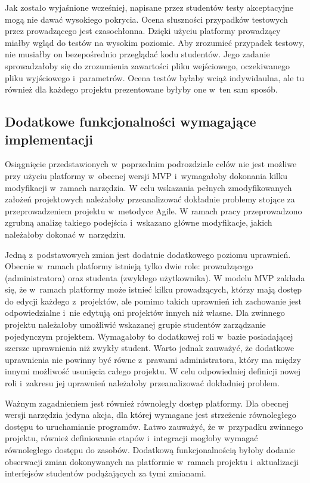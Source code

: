 Jak zostało wyjaśnione wcześniej, napisane przez studentów testy akceptacyjne mogą nie dawać wysokiego pokrycia.
Ocena słuszności przypadków testowych przez prowadzącego jest czasochłonna.
Dzięki użyciu platformy prowadzący miałby wgląd do testów na wysokim poziomie.
Aby zrozumieć przypadek testowy, nie musiałby on bezepośrednio przeglądać kodu studentów.
Jego zadanie sprowadzałoby się do zrozumienia zawartości pliku wejściowego, oczekiwanego pliku wyjściowego i~parametrów.
Ocena testów byłaby wciąż indywidaulna, ale tu również dla każdego projektu prezentowane byłyby one w~ten sam sposób.

\subsection{Dodatkowe funkcjonalności wymagające implementacji}
\label{agile_todo}

Osiągnięcie przedstawionych w~poprzednim podrozdziale celów nie jest możliwe przy użyciu platformy w~obecnej wersji MVP i~wymagałoby dokonania kilku modyfikacji w~ramach narzędzia.
W celu wskazania pełnych zmodyfikowanych założeń projektowych należałoby przeanalizować dokładnie problemy stojące za przeprowadzeniem projektu w~metodyce Agile.
W ramach pracy przeprowadzono zgrubną analizę takiego podejścia i~wskazano główne modyfikacje, jakich należałoby dokonać w~narzędziu.

Jedną z~podstawowych zmian jest dodatnie dodatkowego poziomu uprawnień.
Obecnie w~ramach platformy istnieją tylko dwie role: prowadzącego (administratora) oraz studenta (zwykłego użytkownika).
W modelu MVP zakłada się, że w~ramach platformy może istnieć kilku prowadzących, którzy mają dostęp do edycji każdego z~projektów, ale pomimo takich uprawnień ich zachowanie jest odpowiedzialne i~nie edytują oni projektów innych niż własne.
Dla zwinnego projektu należałoby umożliwić wskazanej grupie studentów zarządzanie pojedynczym projektem.
Wymagałoby to dodatkowej roli w~bazie posiadającej szersze uprawnienia niż zwykły student.
Warto jednak zauważyć, że dodatkowe uprawnienia nie powinny być równe z~prawami administratora, który ma między innymi możliwość usunięcia całego projektu.
W celu odpowiedniej definicji nowej roli i~zakresu jej uprawnień należałoby przeanalizować dokładniej problem.

Ważnym zagadnieniem jest również równoległy dostęp platformy.
Dla obecnej wersji narzędzia jedyna akcja, dla której wymagane jest strzeżenie równoległego dostępu to uruchamianie programów.
Łatwo zauważyć, że w~przypadku zwinnego projektu, również definiowanie etapów i~integracji mogłoby wymagać równoległego dostępu do zasobów.
Dodatkową funkcjonalnością byłoby dodanie obserwacji zmian dokonywanych na platformie w~ramach projektu i~aktualizacji interfejsów studentów podążających za tymi zmianami.

